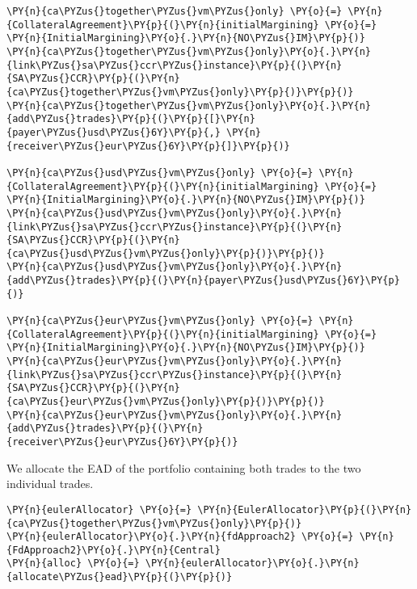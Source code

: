     \begin{tcolorbox}[breakable, size=fbox, boxrule=1pt, pad at break*=1mm,colback=cellbackground, colframe=cellborder]
\begin{Verbatim}[commandchars=\\\{\}]
\PY{n}{ca\PYZus{}together\PYZus{}vm\PYZus{}only} \PY{o}{=} \PY{n}{CollateralAgreement}\PY{p}{(}\PY{n}{initialMargining} \PY{o}{=} \PY{n}{InitialMargining}\PY{o}{.}\PY{n}{NO\PYZus{}IM}\PY{p}{)}
\PY{n}{ca\PYZus{}together\PYZus{}vm\PYZus{}only}\PY{o}{.}\PY{n}{link\PYZus{}sa\PYZus{}ccr\PYZus{}instance}\PY{p}{(}\PY{n}{SA\PYZus{}CCR}\PY{p}{(}\PY{n}{ca\PYZus{}together\PYZus{}vm\PYZus{}only}\PY{p}{)}\PY{p}{)}
\PY{n}{ca\PYZus{}together\PYZus{}vm\PYZus{}only}\PY{o}{.}\PY{n}{add\PYZus{}trades}\PY{p}{(}\PY{p}{[}\PY{n}{payer\PYZus{}usd\PYZus{}6Y}\PY{p}{,} \PY{n}{receiver\PYZus{}eur\PYZus{}6Y}\PY{p}{]}\PY{p}{)}

\PY{n}{ca\PYZus{}usd\PYZus{}vm\PYZus{}only} \PY{o}{=} \PY{n}{CollateralAgreement}\PY{p}{(}\PY{n}{initialMargining} \PY{o}{=} \PY{n}{InitialMargining}\PY{o}{.}\PY{n}{NO\PYZus{}IM}\PY{p}{)}
\PY{n}{ca\PYZus{}usd\PYZus{}vm\PYZus{}only}\PY{o}{.}\PY{n}{link\PYZus{}sa\PYZus{}ccr\PYZus{}instance}\PY{p}{(}\PY{n}{SA\PYZus{}CCR}\PY{p}{(}\PY{n}{ca\PYZus{}usd\PYZus{}vm\PYZus{}only}\PY{p}{)}\PY{p}{)}
\PY{n}{ca\PYZus{}usd\PYZus{}vm\PYZus{}only}\PY{o}{.}\PY{n}{add\PYZus{}trades}\PY{p}{(}\PY{n}{payer\PYZus{}usd\PYZus{}6Y}\PY{p}{)}

\PY{n}{ca\PYZus{}eur\PYZus{}vm\PYZus{}only} \PY{o}{=} \PY{n}{CollateralAgreement}\PY{p}{(}\PY{n}{initialMargining} \PY{o}{=} \PY{n}{InitialMargining}\PY{o}{.}\PY{n}{NO\PYZus{}IM}\PY{p}{)}
\PY{n}{ca\PYZus{}eur\PYZus{}vm\PYZus{}only}\PY{o}{.}\PY{n}{link\PYZus{}sa\PYZus{}ccr\PYZus{}instance}\PY{p}{(}\PY{n}{SA\PYZus{}CCR}\PY{p}{(}\PY{n}{ca\PYZus{}eur\PYZus{}vm\PYZus{}only}\PY{p}{)}\PY{p}{)}
\PY{n}{ca\PYZus{}eur\PYZus{}vm\PYZus{}only}\PY{o}{.}\PY{n}{add\PYZus{}trades}\PY{p}{(}\PY{n}{receiver\PYZus{}eur\PYZus{}6Y}\PY{p}{)}
\end{Verbatim}
\end{tcolorbox}

    We allocate the EAD of the portfolio containing both trades to the two
individual trades.

    \begin{tcolorbox}[breakable, size=fbox, boxrule=1pt, pad at break*=1mm,colback=cellbackground, colframe=cellborder]
\begin{Verbatim}[commandchars=\\\{\}]
\PY{n}{eulerAllocator} \PY{o}{=} \PY{n}{EulerAllocator}\PY{p}{(}\PY{n}{ca\PYZus{}together\PYZus{}vm\PYZus{}only}\PY{p}{)}
\PY{n}{eulerAllocator}\PY{o}{.}\PY{n}{fdApproach2} \PY{o}{=} \PY{n}{FdApproach2}\PY{o}{.}\PY{n}{Central}
\PY{n}{alloc} \PY{o}{=} \PY{n}{eulerAllocator}\PY{o}{.}\PY{n}{allocate\PYZus{}ead}\PY{p}{(}\PY{p}{)}
\end{Verbatim}
\end{tcolorbox}

